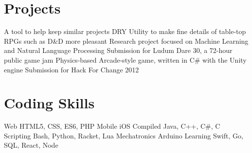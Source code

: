 \documentclass[11pt,a4paper,sans]{moderncv}        %
\begin{document}
\section{Projects}		%
                     {A tool to help keep similar projects DRY}
             {Utility to make fine details of table-top RPGs such as D\&D more pleasant}
                      {Research project focused on Machine Learning and Natural Language Processing}
                  {Submission for Ludum Dare 30, a 72-hour public game jam}
                         {Physics-based Arcade-style game, written in C\# with the Unity engine}
	        {Submission for Hack For Change 2012}

\section{Coding Skills}	%
\cvdoubleitem
{Web}               {HTML5, CSS, ES6, PHP}
{Mobile}            {iOS}
\cvdoubleitem
{Compiled}          {Java, C++, C\#, C}
{Scripting}         {Bash, Python, Racket, Lua}
\cvdoubleitem
{Mechatronics}      {Arduino}
{Learning}          {Swift, Go, SQL, React, Node}
\end{document}
